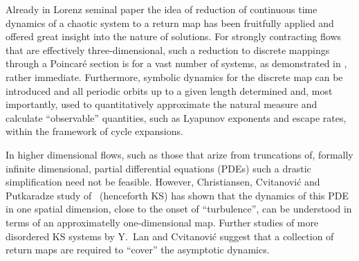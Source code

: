 
Already in Lorenz seminal paper the idea of reduction
of continuous time dynamics of a chaotic system to a return map has been
fruitfully applied and offered great insight into the nature of solutions.
For strongly contracting flows that are effectively three-dimensional,
such a reduction to discrete mappings through a Poincar\'e section is
for a vast number of systems, as demonstrated in , 
rather immediate. Furthermore, symbolic dynamics for the discrete map
can be introduced and all periodic orbits up to a given length determined
and, most importantly, used to quantitatively approximate the natural measure and calculate
``observable'' quantities, such as Lyapunov exponents and
escape rates, within the framework of cycle
expansions.

In higher dimensional flows, such as those that arize from truncations of, formally
infinite dimensional, partial differential equations (PDEs) such a drastic simplification
need not be feasible. 
However, Christiansen, Cvitanovi\'{c} and Putkaradze study of 
\KSe\ (henceforth KS) has shown that the dynamics of this PDE in one spatial dimension, close to the 
onset of ``turbulence'', can be understood in terms of an approximatelly one-dimensional map.
Further studies of more disordered KS systems by Y.~Lan and Cvitanovi\'{c}
suggest that a collection of return maps are required to ``cover'' the asymptotic dynamics.

